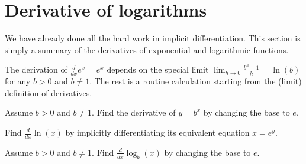 \documentclass[../main.tex]{subfiles}
\begin{document}
 \section{Derivative of logarithms}
We have already done all the hard work in implicit differentiation.  This section is simply a summary of the derivatives of exponential and logarithmic functions.

The derivation of \(\frac{d}{dx} e^{x} = e^{x}\) depends on the special limit \(\lim_{h \to 0} \frac{b^{h} - 1}{h} = \ln(b)\) for any \(b > 0\) and \(b \ne 1\). The rest is a routine calculation starting from the (limit) definition of derivatives.

\begin{exercise}
  Assume \(b > 0\) and \(b \ne 1\). Find the derivative of \(y = b^{x}\) by changing the base to \(e\).

\end{exercise}

\begin{exercise}
  Find \(\frac{d}{dx}\ln(x)\) by implicitly differentiating its equivalent equation \(x = e^{y}\).

\end{exercise}

\begin{exercise}
  Assume \(b > 0\) and \(b \ne 1\). Find \(\frac{d}{dx} \log_{b}(x)\) by changing the base to \(e\).

\end{exercise}
\end{document}
